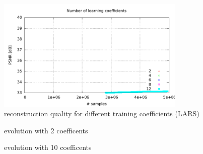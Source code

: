 \begin{figure}[h]
\centering
\includegraphics[width = 0.8\textwidth]{../tests/results/coeffsConverg.pdf}
\caption{reconstruction quality for different training coefficients (LARS)}
\label{fig:coeffsLasso}
\end{figure}

\begin{figure}[H]
\centering
{}
\hspace{15mm}
\caption{evolution with 2 coefficents}
\label{fig:coeffsOMPsamples}
\end{figure}
\begin{figure}[H]
\centering
{}
\hspace{15mm}
\caption{evolution with 10 coefficents}
\label{fig:coeffsOMPsamples}
\end{figure}



